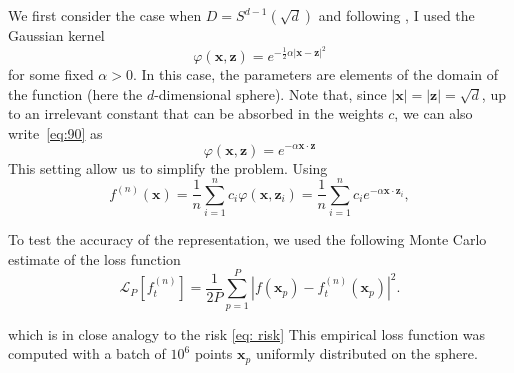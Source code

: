 \documentclass{article}
\begin{document}
We first consider the case when $D = S^{d-1}(\sqrt{d})$ and following \cite{Rostkoff_2022}, I used the Gaussian kernel
%
\begin{equation}
  \label{eq:90}
  \varphi(\mathbf{x},\mathbf{z}) = e^{-\tfrac12 \alpha |\mathbf{x}-\mathbf{z}|^2}
\end{equation}
%
for some fixed $\alpha >0$. In this case, the parameters
are elements of the domain of the function (here the $d$-dimensional
sphere). 
Note that, since $|\mathbf{x}|=|\mathbf{z}| = \sqrt{d}$, up to an
irrelevant constant that can be absorbed in the weights $c$, we can
also write~\eqref{eq:90} as
%
\begin{equation}
  \label{eq:90red}
  \varphi(\mathbf{x},\mathbf{z}) = e^{-\alpha \mathbf{x}\cdot \mathbf{z}}
\end{equation}
%
This setting allow us to simplify the problem. Using
%
\begin{equation}
  \label{eq:119}
  f^{(n)}(\mathbf{x}) = \frac1n \sum_{i=1}^n c_i \varphi(\mathbf{x},\mathbf{z}_i)
  = \frac1n \sum_{i=1}^n c_i e^{-\alpha \mathbf{x}\cdot \mathbf{z}_i},
\end{equation}

 To test the accuracy of the
representation, we used the following Monte Carlo estimate of the loss
function
%
 \begin{equation}
   \label{eq:lossempirical}
   \mathcal{L}_P[f^{(n)}_t] = \frac{1}{2P} \sum_{p=1}^P \left|f(\mathbf{x}_p) - f^{(n)}_t(\mathbf{x}_p)\right|^2.
 \end{equation}

 which is in close analogy to the risk \ref{eq: risk}
 This empirical loss function was computed with a batch of $10^6$
 points $\mathbf{x}_p$ uniformly distributed on the sphere.\\
\end{document}
